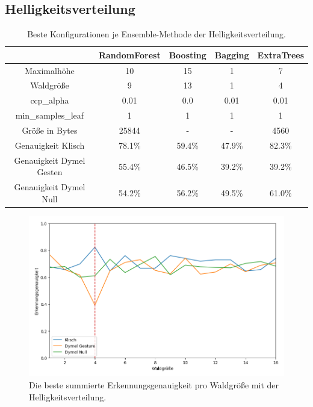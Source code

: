 \subsection{Helligkeitsverteilung}
\begin{table}[h!]
    \centering
    \begin{tabular}{ | c | c | c | c | c |}
        \hline
        & RandomForest & Boosting & Bagging & ExtraTrees \\\hline
        Maximalhöhe & 10 & 15 & 1 & 7 \\\hline
        Waldgröße & 9 & 13 & 1 & 4 \\\hline
        ccp\_alpha & 0.01 & 0.0 & 0.01 & 0.01 \\\hline
        min\_samples\_leaf & 1 & 1 & 1 & 1 \\\hline
        Größe in Bytes & 25844 & - & - & 4560 \\\hline
        Genauigkeit Klisch & 78.1\% & 59.4\% & 47.9\% & 82.3\% \\\hline
        Genauigkeit Dymel Gesten & 55.4\% & 46.5\% & 39.2\% & 39.2\% \\\hline
        Genauigkeit Dymel Null & 54.2\% & 56.2\% & 49.5\% & 61.0\% \\\hline
    \end{tabular}
    \caption{Beste Konfigurationen je Ensemble-Methode der Helligkeitsverteilung.}
    \label{tab:helligkeitsverteilung}
\end{table}
\begin{figure}[h!]
    \centering
    \includegraphics[width=\linewidth]{images/helligkeitsverteilung_acc_per_size.png}
    \caption{Die beste summierte Erkennungsgenauigkeit pro Waldgröße mit der Helligkeitsverteilung.}
    \label{fig:helligkeitsverteilung_per_forest_size}
\end{figure}
